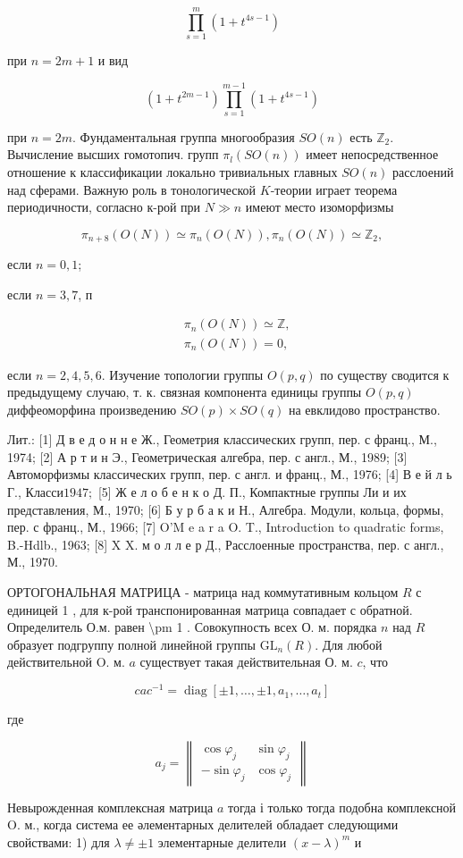 \documentclass[10pt]{article}
\begin{document}
\[
\prod_{s=1}^{m}\left(1+t^{4 s-1}\right)
\]

при $n=2 m+1$ и вид

\[
\left(1+t^{2 m-1}\right) \prod_{s=1}^{m-1}\left(1+t^{4 s-1}\right)
\]

при $n=2 m$. Фундаментальная группа многообразия $S O(n)$ есть $\mathbb{Z}_{2}$. Вычисление высших гомотопич. групп $\pi_{l}(S O(n))$ имеет непосредственное отношение к классификации локально тривиальных главных $S O(n)$ расслоений над сферами. Важную роль в тонологической $K$-теории играет теорема периодичности, согласно к-рой при $N \gg n$ имеют место изоморфизмы

\[
\pi_{n+8}(O(N)) \simeq \pi_{n}(O(N)), \pi_{n}(O(N)) \simeq \mathbb{Z}_{2},
\]

если $n=0,1$;

если $n=3,7$, п

\[
\begin{aligned}
& \pi_{n}(O(N)) \simeq \mathbb{Z}, \\
& \pi_{n}(O(N))=0,
\end{aligned}
\]

если $n=2,4,5,6$. Изучение топологии группы $O(p, q)$ по существу сводится к предыдущему случаю, т. к. связная компонента единицы группы $O(p, q)$ диффеоморфина произведению $S O(p) \times S O(q)$ на евклидово пространство.

Лит.: [1] Д в е д о н н е Ж., Геометрия классических групп, пер. с франц., М., 1974; [2] А р т и н Э., Геометрическая алгебра, пер. с англ., М., 1989; [3] Автоморфизмы классических групп, пер. с англ. и франц., М., 1976; [4] В е й л ь Г., Класси$1947 ;$ [5] Ж е л о б е н к о Д. П., Компактные группы Ли и их представления, М., 1970; [6] Б у р б а к и Н., Алгебра. Модули, кольца, формы, пер. с франц., М., 1966; [7] O'M e a r a O. T., Introduction to quadratic forms, B.-Hdlb., 1963; [8] X $\mathrm{X}$. м о л л е р Д., Расслоенные пространства, пер. с англ., М., 1970.

ОРТОГОНАЛЬНАЯ МАТРИЦА - матрица над коммутативным кольцом $R$ с единицей 1 , для к-рой транспонированная матрица совпадает с обратной. Определитель О.м. равен \textbackslash pm 1 . Совокупность всех $О$. м. порядка $n$ над $R$ образует подгруппу полной линейной группы $\mathrm{GL}_{n}(R)$. Для любой действительной $\mathrm{O}$. м. $a$ существует такая действительная О. м. $c$, что

\[
c a c^{-1}=\operatorname{diag}\left[ \pm 1, \ldots, \pm 1, a_{1}, \ldots, a_{t}\right]
\]

где

\[
a_{j}=\left\|\begin{array}{rr}
\cos \varphi_{j} & \sin \varphi_{j} \\
-\sin \varphi_{j} & \cos \varphi_{j}
\end{array}\right\|
\]

Невырожденная комплексная матрица $a$ тогда і только тогда подобна комплексной $\mathrm{O}$. м., когда система ее әлементарных делителей обладает следующими свойствами: 1) для $\lambda \neq \pm 1$ элементарные делители $(x-\lambda)^{m}$ и
\end{document}
